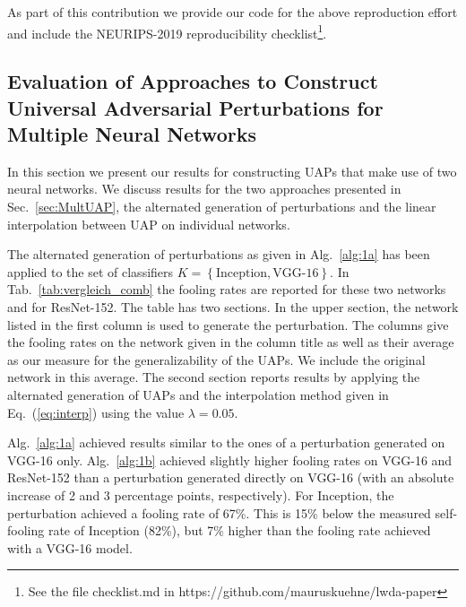 \documentclass[runningheads]{llncs}
\begin{document}
As part of this contribution we provide our code for the above reproduction effort and include the NEURIPS-2019 reproducibility checklist\footnote{See the file checklist.md in https://github.com/mauruskuehne/lwda-paper}.

\subsection{Evaluation of Approaches to Construct Universal Adversarial Perturbations for Multiple Neural Networks}\label{sec:EvaluationCombined}
In this section we present our results for constructing UAPs that make use of two neural networks. We discuss results for the two approaches presented in Sec.~\ref{sec:MultUAP}, the alternated generation of perturbations and the linear interpolation between UAP on individual networks.

The alternated generation of perturbations as given in Alg.~\ref{alg:1a} has been applied to the set of classifiers \(K=\left\{\text{Inception},\text{VGG-16}\right\}\). In Tab.~\ref{tab:vergleich_comb} the fooling rates are reported for these two networks and for ResNet-152. The table has two sections. In the upper section, the network listed in the first column is used to generate the perturbation. The columns give the fooling rates on the network given in the column title as well as their average as our measure for the generalizability of the UAPs. We include the original network in this average. 
The second section reports results by applying the alternated generation of UAPs and the interpolation method given in Eq.~(\ref{eq:interp}) using the value $\lambda=0.05$. 

Alg.~\ref{alg:1a} achieved results similar to the ones of a perturbation generated on VGG-16 only. Alg.~\ref{alg:1b} achieved slightly higher fooling rates on VGG-16 and ResNet-152 than a perturbation generated directly on VGG-16 (with an absolute increase of 2 and 3 percentage points, respectively). For Inception, the perturbation achieved a fooling rate of 67\%. This is 15\% below the measured self-fooling rate of Inception (82\%), but 7\% higher than the fooling rate achieved with a VGG-16 model. 
\end{document}
